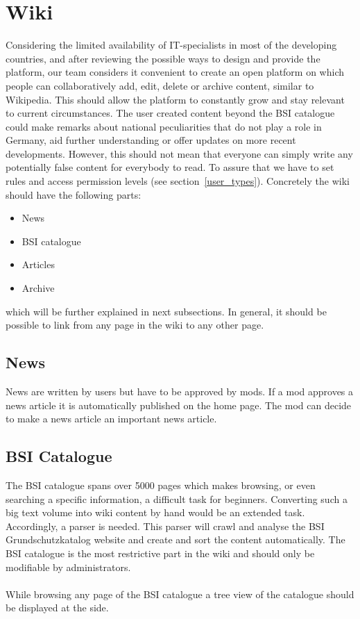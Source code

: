 \section{Wiki } 
Considering the limited availability of IT-specialists in most of the developing countries, and after reviewing the possible ways to design and provide the platform, our team considers it convenient to create an open platform on which people can collaboratively add, edit, delete or archive content, similar to Wikipedia. 
This should allow the platform to constantly grow and stay relevant to current circumstances. 
The user created content beyond the BSI catalogue could make remarks about national peculiarities that do not play a role in Germany, aid further understanding or offer updates on more recent developments.
However, this should not mean that everyone can simply write any potentially false content for everybody to read. 
To assure that we have to set rules and access permission levels (see section~\ref{user_types}). 
Concretely the wiki should have the following parts:
\begin{itemize}
    \item News
    \item BSI catalogue
    \item Articles
    \item Archive
\end{itemize}
which will be further explained in next subsections.
In general, it should be possible to link from any page in the wiki to any other page. 


\subsection{News}
News are written by users but have to be approved by mods.
If a mod approves a news article it is automatically published on the home page.
The mod can decide to make a news article an important news article.

\subsection{BSI Catalogue}
\label{BSIc}
The BSI catalogue spans over 5000 pages which makes browsing, or even searching a specific information, a difficult task for beginners. 
Converting such a big text volume into wiki content by hand would be an extended task. 
Accordingly, a parser is needed. 
This parser will crawl and analyse the BSI Grundschutzkatalog website and create and sort the content automatically. 
The BSI catalogue is the most restrictive part in the wiki and should only be modifiable by administrators.
\\\\
While browsing any page of the BSI catalogue a tree view of the catalogue should be displayed at the side.

